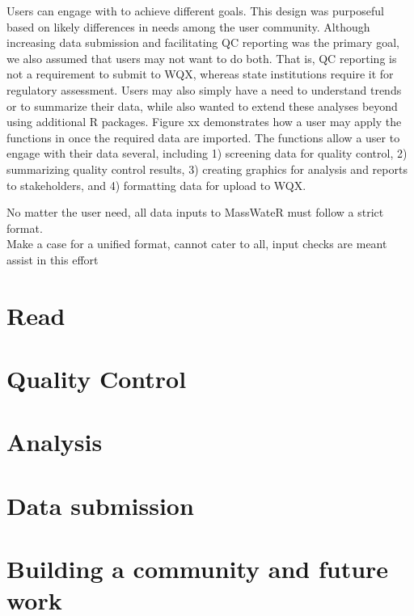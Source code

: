 Users can engage with  to achieve different goals. This design was purposeful based on likely differences in needs among the user community. Although increasing data submission and facilitating QC reporting was the primary goal, we also assumed that users may not want to do both. That is, QC reporting is not a requirement to submit to WQX, whereas state institutions require it for regulatory assessment. Users may also simply have a need to understand trends or to summarize their data, while also wanted to extend these analyses beyond  using additional R packages. Figure xx demonstrates how a user may apply the functions in  once the required data are imported. The functions allow a user to engage with their data several, including 1) screening data for quality control, 2) summarizing quality control results, 3) creating graphics for analysis and reports to stakeholders, and 4) formatting data for upload to WQX.

No matter the user need, all data inputs to MassWateR must follow a strict format.\\
Make a case for a unified format, cannot cater to all, input checks are meant assist in this effort

\hypertarget{read}{%
\section{Read}\label{read}}

\hypertarget{quality-control}{%
\section{Quality Control}\label{quality-control}}

\hypertarget{analysis}{%
\section{Analysis}\label{analysis}}

\hypertarget{data-submission}{%
\section{Data submission}\label{data-submission}}

\hypertarget{building-a-community-and-future-work}{%
\section{Building a community and future work}\label{building-a-community-and-future-work}}

